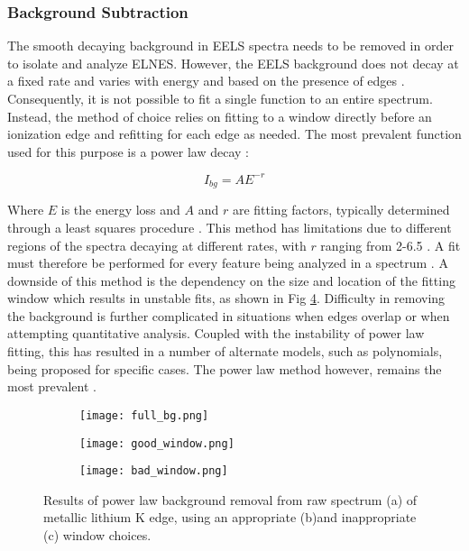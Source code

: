 \subsubsection{Background Subtraction} \label{bg_section}
The smooth decaying background in EELS spectra needs to be removed in order to isolate and analyze ELNES.  However, the EELS background does not decay at a fixed rate and varies with energy and based on the presence of edges \cite{new_bg}. Consequently, it is not possible to fit a single function to an entire spectrum.  Instead, the method of choice relies on fitting to a window directly before an ionization edge and refitting for each edge as needed.  The most prevalent function used for this purpose is a power law decay \cite{Egerton}: 

\begin{equation}
	I_{bg} = AE^{-r}
\end{equation}


Where $E$ is the energy loss and $A$ and $r$ are fitting factors, typically determined through a least squares procedure \cite{reimer_transmission_2008}.  This method has limitations due to different regions of the spectra decaying at different rates, with $r$ ranging from 2-6.5 \cite{reimer_transmission_2008}. A fit must therefore be performed for every feature being analyzed in a spectrum \cite{verbeeck_model_2004, egerton_inelastic_1975}.  A downside of this method is the dependency on the size and location of the fitting window which results in unstable fits, as shown in Fig \ref{bg_removal}.  Difficulty in removing the background is further complicated in situations when edges overlap or when attempting quantitative analysis.  Coupled with the instability of power law fitting, this has resulted in a number of alternate models, such as polynomials, being proposed for specific cases. The power law method however, remains the most prevalent \cite{verbeeck_model_2004, riedl_extraction_2006}.  

\begin{figure}[H]
	\centering
	\begin{subfigure}{0.45\textwidth}
		\texttt{[image: full\_bg.png]} 
		\caption{}
		\label{full_bg}
	\end{subfigure}
	\hspace{-0.01cm}
	
	\begin{subfigure}{0.45\textwidth}
		\texttt{[image: good\_window.png]} 
		\caption{}
		\label{good_window}
	\end{subfigure}
	\begin{subfigure}{0.45\textwidth}
		\texttt{[image: bad\_window.png]} 
		\caption{}
		\label{bad_window}
	\end{subfigure}
	\caption{Results of power law background removal from raw spectrum (a) of metallic lithium K edge, using an appropriate (b)and inappropriate (c) window choices.}
	\label{bg_removal}
\end{figure}

